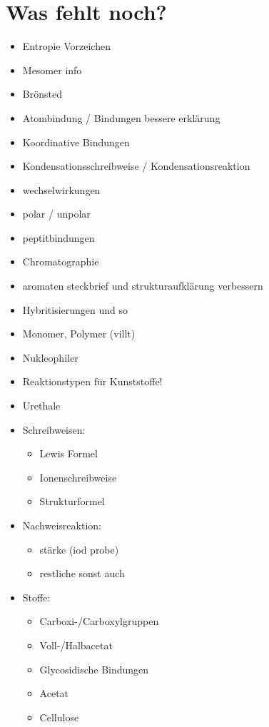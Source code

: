 
\chapter{Was fehlt noch?}
\begin{itemize}
    \item Entropie Vorzeichen
    \item Mesomer info
    \item Brönsted
    \item Atombindung / Bindungen bessere erklärung
    \item Koordinative Bindungen
    \item Kondensationsschreibweise / Kondensationsreaktion
    \item wechselwirkungen
    \item polar / unpolar
    \item peptitbindungen
    \item Chromatographie
    \item aromaten steckbrief und strukturaufklärung verbessern
    \item Hybritisierungen und so
    \item Monomer, Polymer (villt)
    \item Nukleophiler
    \item Reaktionstypen für Kunststoffe!
    \item Urethale
    
    \item Schreibweisen:
    \begin{itemize}
        \item Lewis Formel
        \item Ionenschreibweise
        \item Strukturformel
    \end{itemize}

    \item Nachweisreaktion:
    \begin{itemize}
        \item stärke (iod probe)
        \item restliche sonst auch
    \end{itemize}

    \item Stoffe:
    \begin{itemize}
        \item Carboxi-/Carboxylgruppen
        \item Voll-/Halbacetat
        \item Glycosidische Bindungen
        \item Acetat
        \item Cellulose
    \end{itemize}
\end{itemize}

